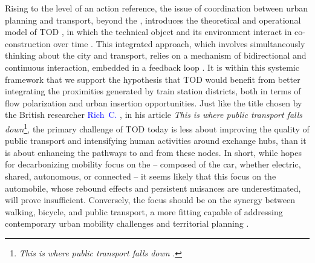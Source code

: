 \begin{refsegment}
Rising to the level of an action reference, the issue of coordination between urban planning and transport, beyond the , introduces the theoretical and operational model of \acrfull{TOD} \textcolor{blue}{\autocite[183-220]{gallez_mythes_2010}}, in which the technical object and its environment interact in co-construction over time \textcolor{blue}{\autocite[44-50]{leheis-guillot_ville_2011}}. This integrated approach, which involves simultaneously thinking about the city and transport, relies on a mechanism of bidirectional and continuous interaction, embedded in a feedback loop \textcolor{blue}{\autocite[130]{wegener_overview_2004}}. It is within this systemic framework that we support the hypothesis that \acrshort{TOD} would benefit from better integrating the proximities generated by train station districts, both in terms of flow polarization and urban insertion opportunities. Just like the title chosen by the British researcher \textcolor{blue}{Rich~C.} \textcolor{blue}{\textcite[40]{mcilroy_this_2023}}, in his article \textsl{This is where public transport falls down}\footnote{
    \textsl{This is where public transport falls down} \textcolor{blue}{\autocite[40]{mcilroy_this_2023}}.
}, the primary challenge of \acrshort{TOD} today is less about improving the quality of public transport and intensifying human activities around exchange hubs, than it is about enhancing the pathways to and from these nodes. In short, while hopes for decarbonizing mobility focus on the  – composed of the car, whether electric, shared, autonomous, or connected – it seems likely that this focus on the automobile, whose rebound effects and persistent nuisances are underestimated, will prove insufficient. Conversely, the focus should be on the synergy between walking, \gls{bicycle}, and public transport, a more fitting  capable of addressing contemporary urban mobility challenges and territorial planning \textcolor{blue}{\autocite[1]{soulas_triptyque_2021}}.%


\end{refsegment}
